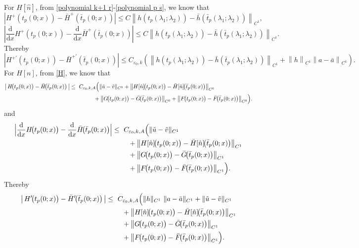 \documentclass[a4paper,reqno,11pt]{amsart}
\numberwithin{equation}{section} %
\begin{document}
For $H[\hat{n}]$, from \eqref{polynomial k+1 r}-\eqref{polynomial p s}, we know that
$$
\left| H^+\left( t_p(0;x) \right) -\bar{H}^+\left( \bar{t}_p(0;x) \right) \right|\le C\left\| h\left( t_p\left( \lambda _1;\lambda _2 \right) \right) -\bar{h}\left( \bar{t}_p\left( \lambda _1;\lambda _2 \right) \right) \right\| _{C^1},
$$
$$
\left| \frac{\mathrm{d}}{\mathrm{d}x} H^+\left( t_p(0;x) \right) -\frac{\mathrm{d}}{\mathrm{d}x}\bar{H}^+\left( \bar{t}_p(0;x) \right) \right|\le C\left\| h\left( t_p\left( \lambda _1;\lambda _2 \right) \right) -\bar{h}\left( \bar{t}_p\left( \lambda _1;\lambda _2 \right) \right) \right\| _{C^1}.
$$
Thereby
$$
\left| H^{+\prime}\left( t_p(0;x) \right) -\bar{H}^{+\prime}\left( \bar{t}_p(0;x) \right) \right|\le C_{\varepsilon _0,k}\left( \left\| h\left( t_p\left( \lambda _1;\lambda _2 \right) \right) -\bar{h}\left( \bar{t}_p\left( \lambda _1;\lambda _2 \right) \right) \right\| _{C^1}+\left\| h \right\| _{C^1}\left\| a-\bar{a} \right\| _{C^1} \right) .
$$
For $H[n]$, from \eqref{H}, we know that 
\[
\begin{aligned}
\bigl|\,H\!\bigl(t_p(0;x)\bigr)-\bar H\!\bigl(\bar t_p(0;x)\bigr)\,\bigr|
\le{}&\ C_{\varepsilon_0,k,A}\Bigl(
  \|\tilde u-\tilde v\|_{C^{0}}
  + \bigl\| H[\hat n]\!\bigl(t_p(0;x)\bigr)-\bar H[\hat n]\!\bigl(\bar t_p(0;x)\bigr)\bigr\|_{C^{0}} \\
&\qquad\quad
  + \bigl\| G\!\bigl(t_p(0;x)\bigr)-\bar G\!\bigl(\bar t_p(0;x)\bigr)\bigr\|_{C^{0}}
  + \bigl\| F\!\bigl(t_p(0;x)\bigr)-\bar F\!\bigl(\bar t_p(0;x)\bigr)\bigr\|_{C^{0}}
\Bigr).
\end{aligned}
\]
and
\[
\begin{aligned}
\Bigl|\frac{\mathrm d}{\mathrm dx}H\!\bigl(t_p(0;x)\bigr)
 - \frac{\mathrm d}{\mathrm dx}\bar H\!\bigl(\bar t_p(0;x)\bigr)\Bigr|
\le{}&\ C_{\varepsilon_0,k,A}\Bigl(
  \|\tilde u-\tilde v\|_{C^{1}} \\
&\quad + \bigl\| H[\hat n]\!\bigl(t_p(0;x)\bigr)
          - \bar H[\hat n]\!\bigl(\bar t_p(0;x)\bigr) \bigr\|_{C^{1}} \\
&\quad + \bigl\| G\!\bigl(t_p(0;x)\bigr)
          - \bar G\!\bigl(\bar t_p(0;x)\bigr) \bigr\|_{C^{1}} \\
&\quad + \bigl\| F\!\bigl(t_p(0;x)\bigr)
          - \bar F\!\bigl(\bar t_p(0;x)\bigr) \bigr\|_{C^{1}}
\Bigr).
\end{aligned}
\]
Thereby
\[
\begin{aligned}
\bigl|\,H^{ \prime}\!\bigl(t_p(0;x)\bigr)-\bar H^{ \prime}\!\bigl(\bar t_p(0;x)\bigr)\,\bigr|
\le{}&\ C_{\varepsilon_0,k,A}\Bigl(
  \|h\|_{C^{1}}\ \|a-\bar a\|_{C^{1}}
  + \|\tilde u-\tilde v\|_{C^{1}} \\
&\quad + \bigl\| H[\hat n]\!\bigl(t_p(0;x)\bigr)-\bar H[\hat n]\!\bigl(\bar t_p(0;x)\bigr) \bigr\|_{C^{1}} \\
&\quad + \bigl\| G\!\bigl(t_p(0;x)\bigr)-\bar G\!\bigl(\bar t_p(0;x)\bigr) \bigr\|_{C^{1}} \\
&\quad + \bigl\| F\!\bigl(t_p(0;x)\bigr)-\bar F\!\bigl(\bar t_p(0;x)\bigr) \bigr\|_{C^{1}}
\Bigr).
\end{aligned}
\]
\end{document}
